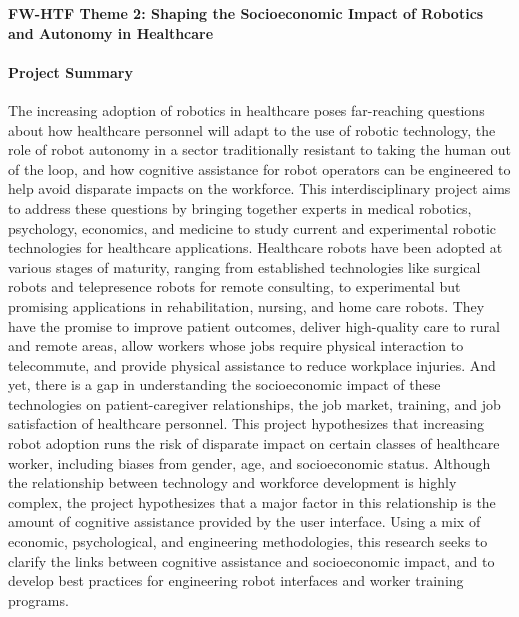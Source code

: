 \pagebreak

\begin{center}
	{\Large \bf FW-HTF Theme 2: Shaping the Socioeconomic Impact of Robotics and Autonomy in Healthcare}
\end{center}

\vspace{1 em}

\paragraph*{\Large Project Summary} 
The increasing adoption of robotics in healthcare poses far-reaching questions about how healthcare personnel will adapt to the use of robotic technology, the role of robot autonomy in a sector traditionally resistant to taking the human out of the loop, and how cognitive assistance for robot operators can be engineered to help avoid disparate impacts on the workforce.  This interdisciplinary project aims to address these questions by bringing together experts in medical robotics, psychology, economics, and medicine to study current and experimental robotic technologies for healthcare applications.  Healthcare robots have been adopted at various stages of maturity, ranging from established technologies like surgical robots and telepresence robots for remote consulting, to experimental but promising applications in rehabilitation, nursing, and home care robots.  They have the promise to improve patient outcomes, deliver high-quality care to rural and remote areas, allow workers whose jobs require physical interaction to telecommute, and provide physical assistance to reduce workplace injuries. And yet, there is a gap in understanding the socioeconomic impact of these technologies on patient-caregiver relationships, the job market, training, and job satisfaction of healthcare personnel.  This project hypothesizes that increasing robot adoption runs the risk of disparate impact on certain classes of healthcare worker, including biases from gender, age, and socioeconomic status.  Although the relationship between technology and workforce development is highly complex, the project hypothesizes that a major factor in this relationship is the amount of cognitive assistance provided by the user interface.  Using a mix of economic, psychological, and engineering methodologies, this research seeks to clarify the links between cognitive assistance and socioeconomic impact, and to develop best practices for engineering robot interfaces and worker training programs.

